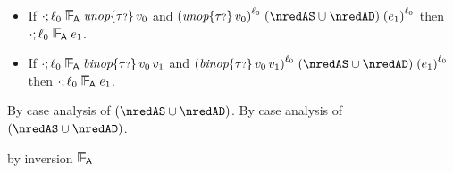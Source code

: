 \begin{lemma}\label{A-delta-label-preservation}\leavevmode
  \begin{itemize}
    \item
      If\/ $\snil; \sowner_0 \sWLA \eunopt{\stoptional}{\svalue_0}$
      and\/ $\obars{\eunopt{\stoptional}{\svalue_0}}{\sowner_0} \nredAX \obars{\sexpr_1}{\sowner_0}$
      then\/ $\snil; \sowner_0 \sWLA \sexpr_1$.
    \item
      If\/ $\snil; \sowner_0 \sWLA \ebinopt{\stoptional}{\svalue_0}{\svalue_1}$
      and\/ $\obars{\ebinopt{\stoptional}{\svalue_0}{\svalue_1}}{\sowner_0} \nredAX \obars{\sexpr_1}{\sowner_0}$
      then\/ $\snil; \sowner_0 \sWLA \sexpr_1$.
  \end{itemize}
\end{lemma}{
\newcommand{\shortproof}{By case analysis of $\nredAX$.}
\begin{lamportproof*}
  \shortproof
\mainproof
  \shortproof

    \begin{pfproof}
        \begin{pfproof}
          by inversion $\sWLA$
        \end{pfproof}
      \qedstep
    \end{pfproof}


\end{lamportproof*}}
